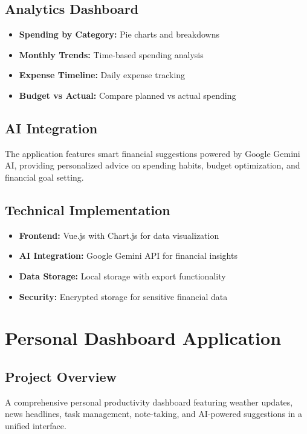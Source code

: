 \documentclass[11pt,a4paper]{article}
\begin{document}
\subsection{Analytics Dashboard}
\begin{itemize}[leftmargin=1.5cm]
\item \textbf{Spending by Category:} Pie charts and breakdowns
\item \textbf{Monthly Trends:} Time-based spending analysis
\item \textbf{Expense Timeline:} Daily expense tracking
\item \textbf{Budget vs Actual:} Compare planned vs actual spending
\end{itemize}

\subsection{AI Integration}
The application features smart financial suggestions powered by Google Gemini AI, providing personalized advice on spending habits, budget optimization, and financial goal setting.

\subsection{Technical Implementation}
\begin{itemize}[leftmargin=1.5cm]
\item \textbf{Frontend:} Vue.js with Chart.js for data visualization
\item \textbf{AI Integration:} Google Gemini API for financial insights
\item \textbf{Data Storage:} Local storage with export functionality
\item \textbf{Security:} Encrypted storage for sensitive financial data
\end{itemize}

\newpage

\section{Personal Dashboard Application}

\subsection{Project Overview}
A comprehensive personal productivity dashboard featuring weather updates, news headlines, task management, note-taking, and AI-powered suggestions in a unified interface.
\end{document}
